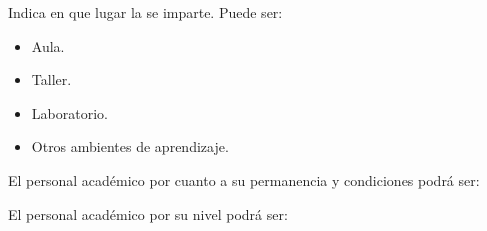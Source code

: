 \begin{bGlosario}
%	
%

	
	 Indica en que lugar la  se imparte. Puede ser:
	\begin{itemize}
		\item Aula.
		\item Taller.
		\item Laboratorio.
		\item Otros ambientes de aprendizaje.
	\end{itemize}

	 El personal académico por cuanto a su permanencia y condiciones podrá ser:\\
	
	\begin{Titemize}
	\end{Titemize}

		
	 El personal académico por su nivel podrá ser:\\
	\begin{Titemize}
		\Titem [A]
		\Titem [B]
		\Titem [C] 
	\end{Titemize}



\end{bGlosario}
